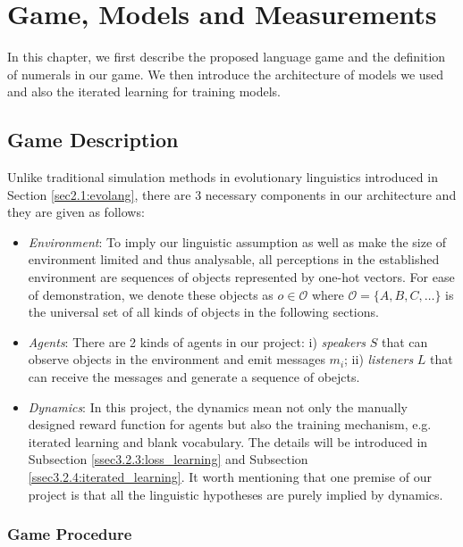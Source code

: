 \chapter{Game, Models and Measurements}
\label{ch3:game_model}

In this chapter, we first describe the proposed language game and the definition of numerals in our game. We then introduce the architecture of models we used and also the iterated learning for training models.

\section{Game Description}
\label{sec3.1:game_description}

Unlike traditional simulation methods in evolutionary linguistics introduced in Section \ref{sec2.1:evolang}, there are 3 necessary components in our architecture and they are given as follows:

\begin{itemize}
  \item \textit{Environment}: To imply our linguistic assumption as well as make the size of environment limited and thus analysable, all perceptions in the established environment are sequences of objects represented by one-hot vectors. For ease of demonstration, we denote these objects as $o \in \mathcal{O}$ where $\mathcal{O} = \{A, B, C, \dots\}$ is the universal set of all kinds of objects in the following sections.
  \item \textit{Agents}: There are 2 kinds of agents in our project: i) \textit{speakers} $S$ that can observe objects in the environment and emit messages $m_i$; ii) \textit{listeners} $L$ that can receive the messages and generate a sequence of obejcts.
  \item \textit{Dynamics}: In this project, the dynamics mean not only the manually designed reward function for agents but also the training mechanism, e.g. iterated learning and blank vocabulary. The details will be introduced in Subsection \ref{ssec3.2.3:loss_learning} and Subsection \ref{ssec3.2.4:iterated_learning}. It worth mentioning that one premise of our project is that all the linguistic hypotheses are purely implied by dynamics.
\end{itemize}

\subsection{Game Procedure}
\label{ssec3.1.1:game_procedure}

